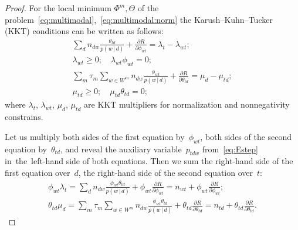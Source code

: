 \documentclass{sig-alternate}
\newcommand{\cond}{\mspace{3mu}{|}\mspace{3mu}}
\begin{document}
\begin{proof}
    For the local minimum $\Phi^m,\Theta$
    of the problem~\eqref{eq:multimodal},~\eqref{eq:multimodal:norm}
    the Karush--Kuhn--Tucker (KKT) conditions can be written as follows:
    \begin{gather*}
        \sum_{d} n_{dw} \frac{\theta_{td}}{p(w\cond d)} + \frac{\partial R}{\partial \phi_{wt}}
        = \lambda_t - \lambda_{wt};
    \\
        \lambda_{wt}\geq 0;
        \quad
        \lambda_{wt}\phi_{wt} = 0;
    \\
        \sum_{m} \tau_m \!\!\sum_{w\in W^m}\!\! n_{dw} \frac{\phi_{wt}}{p(w\cond d)} + \frac{\partial R}{\partial \theta_{td}}
        = \mu_d - \mu_{td};
    \\
        \mu_{td}\geq 0;
        \quad
        \mu_{td}\theta_{td} = 0;
    \end{gather*}
    where $\lambda_t$, $\lambda_{wt}$, $\mu_d$, $\mu_{td}$
    are KKT multipliers for normalization and nonnegativity constrains.

    Let us multiply
    both sides of the first equation by~$\phi_{wt}$,
    both sides of the second equation by~$\theta_{td}$,
    and reveal the auxiliary variable~$p_{tdw}$ from~\eqref{eq:Estep}
    in~the~left-hand side of both equations.
    Then we sum
    the right-hand side of the first equation over~$d$,
    the right-hand side of the second equation over~$t$:
    \begin{gather*}
        \phi_{wt} \lambda_t
        =
        \sum_{d}
        n_{dw} \frac{\phi_{wt}\theta_{td}}{p(w\cond d)}
        + \phi_{wt} \frac{\partial R}{\partial \phi_{wt}}
        =
        n_{wt} + \phi_{wt} \frac{\partial R}{\partial \phi_{wt}};
    \\
        \theta_{td} \mu_{d}
        =
        \sum_{m} \tau_m \!\!\!\sum_{w\in W^m}\!\!\!
        n_{dw} \frac{\phi_{wt}\theta_{td}}{p(w\cond d)}
        + \theta_{td} \frac{\partial R}{\partial \theta_{td}}
        =
        n_{td} + \theta_{td} \frac{\partial R}{\partial \theta_{td}}.
    \end{gather*}


\end{proof}
\end{document}
